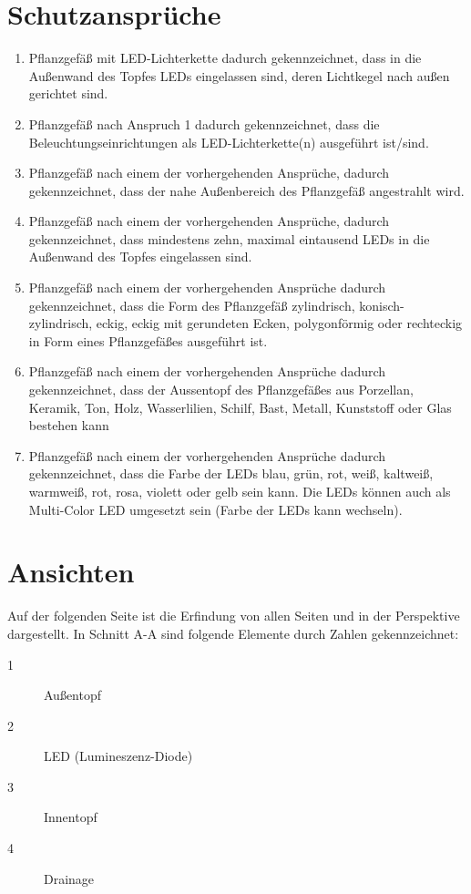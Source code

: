 \documentclass[ngerman, 12pt, a4paper]{scrartcl}
\begin{document}
\section*{Schutzansprüche}
\begin{enumerate}
\item Pflanzgefäß mit LED-Lichterkette dadurch gekennzeichnet, dass in die Außenwand des
Topfes LEDs eingelassen sind, deren Lichtkegel nach außen gerichtet sind.
\item Pflanzgefäß nach Anspruch 1 dadurch gekennzeichnet, dass die Beleuchtungseinrichtungen
als LED-Lichterkette(n) ausgeführt ist/sind.
\item Pflanzgefäß nach einem der vorhergehenden Ansprüche, dadurch gekennzeichnet, dass der
nahe Außenbereich des Pflanzgefäß angestrahlt wird.
\item Pflanzgefäß nach einem der vorhergehenden Ansprüche, dadurch gekennzeichnet, dass
mindestens zehn, maximal eintausend LEDs in die Außenwand des Topfes eingelassen sind.
\item Pflanzgefäß nach einem der vorhergehenden Ansprüche dadurch gekennzeichnet, dass die
Form des Pflanzgefäß zylindrisch, konisch-zylindrisch, eckig, eckig mit gerundeten Ecken,
polygonförmig oder rechteckig in Form eines Pflanzgefäßes ausgeführt ist.
\item Pflanzgefäß nach einem der vorhergehenden Ansprüche dadurch gekennzeichnet, dass der
Aussentopf des Pflanzgefäßes aus Porzellan, Keramik, Ton, Holz, Wasserlilien, Schilf, Bast, Metall,
Kunststoff oder Glas bestehen kann
\item Pflanzgefäß nach einem der vorhergehenden Ansprüche dadurch gekennzeichnet, dass die
Farbe der LEDs blau, grün, rot, weiß, kaltweiß, warmweiß, rot, rosa, violett oder gelb sein
kann. Die LEDs können auch als Multi-Color LED umgesetzt sein (Farbe der LEDs kann wechseln).
\end{enumerate}

\newpage
\goodbreak
\pagebreak

\section*{Ansichten}
Auf der folgenden Seite ist die Erfindung von allen Seiten und in der Perspektive dargestellt.
In Schnitt A-A sind folgende Elemente durch Zahlen gekennzeichnet:
\begin{description}
\item[1] Außentopf
\item[2] LED (Lumineszenz-Diode)
\item[3] Innentopf
\item[4] Drainage
\end{description}



\end{document}
